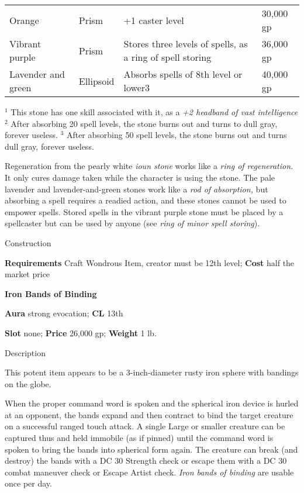 \begin{table}[]
\begin{tabular}{llll}
Orange             & Prism          & +1 caster level                                                              & 30,000 gp             \\
Vibrant purple     & Prism          & Stores three levels of spells, as a ring of spell storing                    & 36,000 gp             \\
Lavender and green & Ellipsoid      & Absorbs spells of 8th level or lower3                                        & 40,000 gp             \\
\end{tabular}
\(^{1}\) This stone has one skill associated with it, as a \emph{+2 headband of vast intelligence}
\(^{2}\) After absorbing 20 spell levels, the stone burns out and turns to dull gray, forever useless.
\(^{3}\) After absorbing 50 spell levels, the stone burns out and turns dull gray, forever useless.
\end{table}


				
Regeneration from the pearly white \textit{ioun stone} works like a \textit{ring of regeneration.} It only cures damage taken while the character is using the stone. The pale lavender and lavender-and-green stones work like a \textit{rod of absorption,} but absorbing a spell requires a readied action, and these stones cannot be used to empower spells. Stored spells in the vibrant purple stone must be placed by a spellcaster but can be used by anyone (see \textit{ring of minor spell storing}). 
				
Construction
				
\textbf{Requirements} Craft Wondrous Item, creator must be 12th level;\textbf{ Cost }half the market price
				
\textbf{Iron Bands of Binding}
				
\textbf{Aura} strong evocation;\textbf{ CL }13th
				
\textbf{Slot} none; \textbf{Price} 26,000 gp; \textbf{Weight} 1 lb.
				
Description
				
This potent item appears to be a 3-inch-diameter rusty iron sphere with bandings on the globe.
				
When the proper command word is spoken and the spherical iron device is hurled at an opponent, the bands expand and then contract to bind the target creature on a successful ranged touch attack. A single Large or smaller creature can be captured thus and held immobile (as if pinned) until the command word is spoken to bring the bands into spherical form again. The creature can break (and destroy) the bands with a DC 30 Strength check or escape them with a DC 30 combat maneuver check or Escape Artist check. \textit{Iron bands of binding} are usable once per day. 
				
